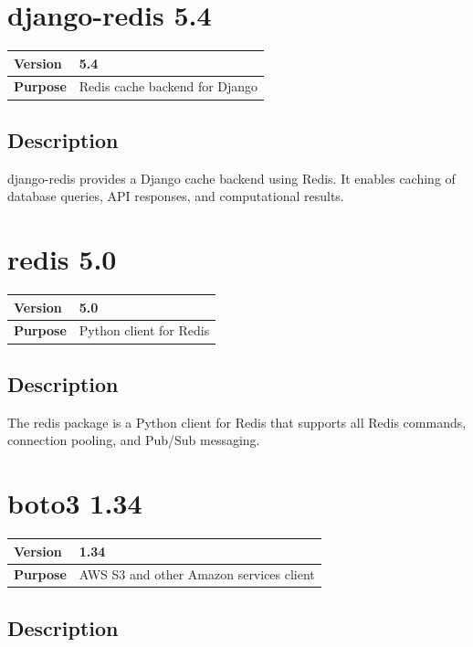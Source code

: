 \documentclass[12pt,a4paper]{report}
\begin{document}
\section{django-redis 5.4}

\begin{tabular}{|p{4cm}|p{10cm}|}
\hline
\textbf{Version} & 5.4 \\
\hline
\textbf{Purpose} & Redis cache backend for Django \\
\hline
\end{tabular}

\subsection{Description}

django-redis provides a Django cache backend using Redis. It enables caching of database queries, API responses, and computational results.

\section{redis 5.0}

\begin{tabular}{|p{4cm}|p{10cm}|}
\hline
\textbf{Version} & 5.0 \\
\hline
\textbf{Purpose} & Python client for Redis \\
\hline
\end{tabular}

\subsection{Description}

The redis package is a Python client for Redis that supports all Redis commands, connection pooling, and Pub/Sub messaging.

\section{boto3 1.34}

\begin{tabular}{|p{4cm}|p{10cm}|}
\hline
\textbf{Version} & 1.34 \\
\hline
\textbf{Purpose} & AWS S3 and other Amazon services client \\
\hline
\end{tabular}

\subsection{Description}
\end{document}
